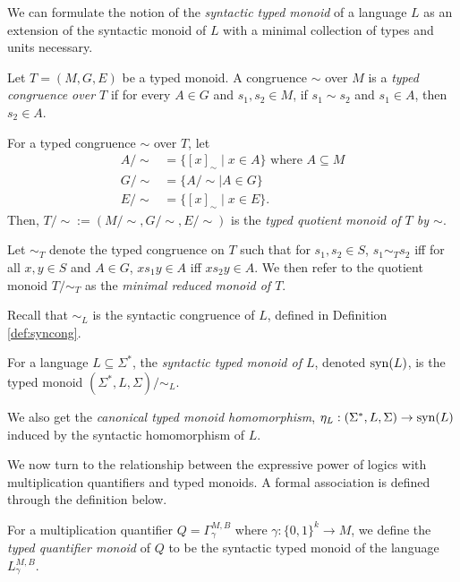 \documentclass[a4paper,UKenglish,cleveref, autoref, thm-restate, anonymous]{lipics-v2021}
\begin{document}
We can formulate the notion of the \emph{syntactic typed monoid} of a language $L$ as an extension of the syntactic monoid of $L$ with a minimal collection of types and units necessary.
\begin{definition}\label{def:typedcongmin}
    Let $T = (M, G, E)$ be a typed monoid. A congruence $\sim$ over $M$ is a \emph{typed congruence over $T$} if for every $A \in G$ and $s_1,s_2\in M$, if $s_1 \sim s_2$ and $s_1 \in A$, then $s_2 \in A$.

    For a typed congruence $\sim$ over $T$, let
    \begin{align*}
        A/{\sim} &= \{[x]_\sim \mid x \in A\} \text{ where $A \subseteq M$}\\
        G/{\sim} &= \{A/{\sim} \mid A \in G\}\\
        E/{\sim} &= \{[x]_\sim \mid x \in E\}.
    \end{align*}
    \noindent Then, $T/{\sim} := (M/{\sim}, G/{\sim}, E/{\sim})$ is the \emph{typed quotient monoid of $T$ by $\sim$}.

    Let $\sim_T$ denote the typed congruence on $T$ such that for $s_1,s_2 \in S$, $s_1 \sim_T s_2$ iff for all $x,y \in S$ and $A \in G$, $xs_1y \in A$ iff $xs_2y \in A$. We then refer to the quotient monoid $T/{\sim_T}$ as the \emph{minimal reduced monoid of $T$}.
\end{definition}

Recall that ${\sim_L}$ is the syntactic congruence of $L$, defined in Definition \ref{def:syncong}.
\begin{definition}
    For a language $L \subseteq \Sigma^*$, the \emph{syntactic typed monoid of $L$}, denoted $\mathrm{syn}(L)$, is the typed monoid $(\Sigma^*, L, \Sigma)/{\sim_L}$. 
\end{definition} 
    We also get the \emph{canonical typed monoid homomorphism}, $\eta_L : (\Sigma^*, L, \Sigma) \rightarrow \mathrm{syn}(L)$ induced by the syntactic homomorphism of $L$.


We now turn to the relationship between the expressive power of logics with multiplication quantifiers and typed monoids.  A formal association is defined through the definition below.

\begin{definition}\label{def:origtypedquantsemi}
    For a multiplication quantifier $Q=\Gamma^{M,B}_{\gamma}$ where $\gamma : \{0,1\}^k \rightarrow M$, we define the \emph{typed quantifier monoid} of $Q$ to be the syntactic typed monoid of the language $L^{M,B}_{\gamma}$.  
\end{definition}
\end{document}
